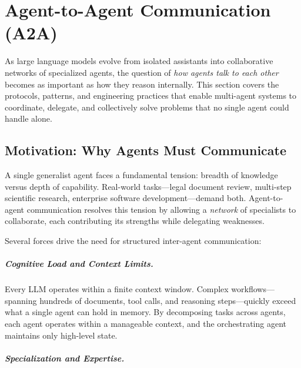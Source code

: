 \chapter{Agent-to-Agent Communication (A2A)}
\label{sec:a2a}

As large language models evolve from isolated assistants into collaborative networks of specialized agents, the question of \emph{how agents talk to each other} becomes as important as how they reason internally. This section covers the protocols, patterns, and engineering practices that enable multi-agent systems to coordinate, delegate, and collectively solve problems that no single agent could handle alone.

\section{Motivation: Why Agents Must Communicate}
\label{sec:a2a:motivation}

\begin{intuitionbox}
A single generalist agent faces a fundamental tension: breadth of knowledge versus depth of capability. Real-world tasks---legal document review, multi-step scientific research, enterprise software development---demand both. Agent-to-agent communication resolves this tension by allowing a \emph{network} of specialists to collaborate, each contributing its strengths while delegating weaknesses.
\end{intuitionbox}

Several forces drive the need for structured inter-agent communication:

\paragraph{Cognitive Load and Context Limits.}
\label{cognitive-load-and-context-limits.}

Every LLM operates within a finite context window. Complex workflows---spanning hundreds of documents, tool calls, and reasoning steps---quickly exceed what a single agent can hold in memory. By decomposing tasks across agents, each agent operates within a manageable context, and the orchestrating agent maintains only high-level state.

\paragraph{Specialization and Expertise.}
\label{specialization-and-expertise.}

